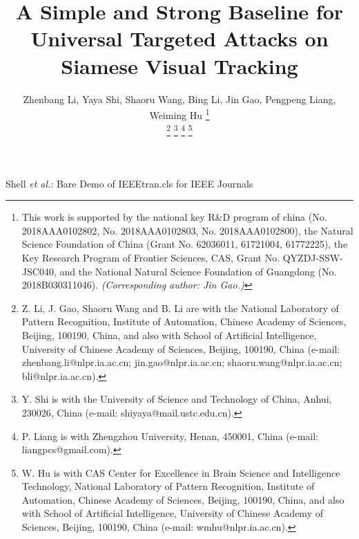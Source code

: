 \documentclass[journal]{IEEEtran}
\begin{document}
\title{A Simple and Strong Baseline for Universal Targeted Attacks on Siamese Visual Tracking}
\author{
  Zhenbang Li, Yaya Shi, Shaoru Wang, Bing Li, Jin Gao, Pengpeng Liang, Weiming Hu
  \thanks{This work is supported by the national key R\&D program of china (No. 2018AAA0102802, No. 2018AAA0102803, No. 2018AAA0102800), the Natural Science Foundation of China (Grant No. 62036011, 61721004, 61772225), the Key Research Program of Frontier Sciences, CAS, Grant No. QYZDJ-SSW-JSC040, and the National Natural Science Foundation of Guangdong (No. 2018B030311046). \textit{(Corresponding author: Jin Gao.)}}
  
  \thanks{Z. Li, J. Gao, Shaoru Wang and B. Li are with the National Laboratory of Pattern Recognition, Institute of Automation, Chinese Academy of Sciences, Beijing, 100190, China, and also with School of Artificial Intelligence, University of Chinese Academy of Sciences, Beijing, 100190, China (e-mail: zhenbang.li@nlpr.ia.ac.cn; jin.gao@nlpr.ia.ac.cn; shaoru.wang@nlpr.ia.ac.cn; bli@nlpr.ia.ac.cn).}
  \thanks{Y. Shi is with the University of Science and Technology of China, Anhui, 230026, China (e-mail: shiyaya@mail.ustc.edu.cn).}
  \thanks{P. Liang is with Zhengzhou University, Henan, 450001, China (e-mail: liangpcs@gmail.com).}
  \thanks{W. Hu is with CAS Center for Excellence in Brain Science and Intelligence Technology, National Laboratory of Pattern Recognition, Institute of Automation, Chinese Academy of Sciences, Beijing, 100190, China, and also with School of Artificial Intelligence, University of Chinese Academy of Sciences, Beijing, 100190, China (e-mail: wmhu@nlpr.ia.ac.cn).}
}

{Shell \MakeLowercase{\textit{et al.}}: Bare Demo of IEEEtran.cls for IEEE Journals}
\maketitle
\end{document}
